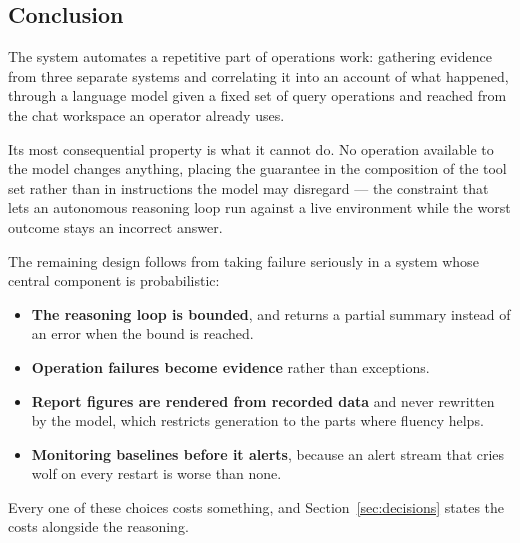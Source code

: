 \documentclass[11pt,a4paper]{article}
\begin{document}
\subsection{Conclusion}

The system automates a repetitive part of operations work: gathering evidence from
three separate systems and correlating it into an account of what happened, through a
language model given a fixed set of query operations and reached from the chat
workspace an operator already uses.

Its most consequential property is what it cannot do. No operation available to the
model changes anything, placing the guarantee in the composition of the tool set
rather than in instructions the model may disregard --- the constraint that lets an
autonomous reasoning loop run against a live environment while the worst outcome
stays an incorrect answer.

The remaining design follows from taking failure seriously in a system whose central
component is probabilistic:

\begin{itemize}
  \item \textbf{The reasoning loop is bounded}, and returns a partial summary instead
        of an error when the bound is reached.
  \item \textbf{Operation failures become evidence} rather than exceptions.
  \item \textbf{Report figures are rendered from recorded data} and never rewritten
        by the model, which restricts generation to the parts where fluency helps.
  \item \textbf{Monitoring baselines before it alerts}, because an alert stream that
        cries wolf on every restart is worse than none.
\end{itemize}

Every one of these choices costs something, and Section~\ref{sec:decisions} states the
costs alongside the reasoning.
\end{document}
